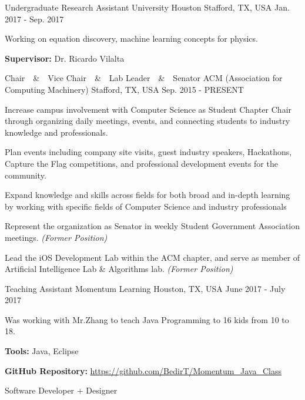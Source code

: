 \begin{cventries}
  \cventry
  	{Undergraduate Research Assistant}
    {University Houston}
    {Stafford, TX, USA}
    {Jan. 2017 - Sep. 2017}
    {
      \begin{cvitems}
        \item {Working on equation discovery, machine learning concepts for physics.}
        \item {\textbf{Supervisor:} Dr. Ricardo Vilalta}
      \end{cvitems}
    }
  \cventry
  	{Chair~~\&~~Vice Chair~~\&~~Lab Leader~~\&~~Senator}
    {ACM (Association for Computing Machinery)}
    {Stafford, TX, USA}
    {Sep. 2015 - PRESENT}
    {
      \begin{cvitems}
        \item {Increase campus involvement with Computer Science as Student Chapter Chair through organizing daily meetings, events, and connecting students to industry knowledge and professionals.}
        \item {Plan events including company site visits, guest industry speakers, Hackathons, Capture the Flag competitions, and professional development events for the community.}
        \item {Expand knowledge and skills across fields for both broad and in-depth learning by working with specific fields of
Computer Science and industry professionals}
		\item{Represent the organization as Senator in weekly Student Government Association meetings. \textit{(Former Position)}}
       	\item{ Lead the iOS Development Lab within the ACM chapter, and serve as member of Artificial Intelligence Lab \& Algorithms lab. \textit{(Former Position)}}
      \end{cvitems}
    }
    \cventry
  	{Teaching Assistant}
    {Momentum Learning}
    {Houston, TX, USA}
    {June 2017 - July 2017}
    {
      \begin{cvitems}
        \item {Was working with Mr.Zhang to teach Java Programming to 16 kids from 10 to 18.}
        \item {\textbf{Tools:} Java, Eclipse}
        \item {\textbf{GitHub Repository:} \href{https://github.com/BedirT/Momentum\_Java\_Class}{https://github.com/BedirT/Momentum\_Java\_Class}}
      \end{cvitems}
    }
    \cventry
  	{Software Developer + Designer}

\end{cventries}
